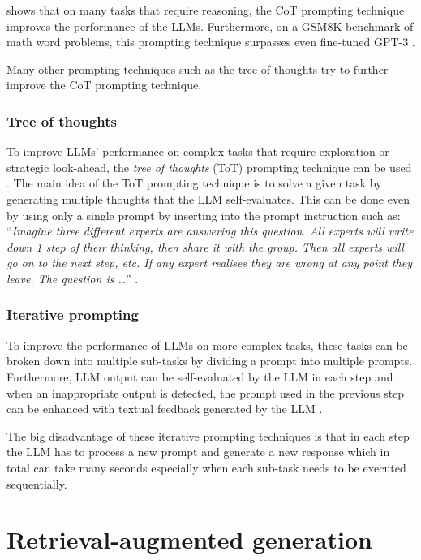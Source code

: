 \citet{Wei2022} shows that on many tasks that require reasoning, the CoT prompting technique improves the performance of the LLMs. Furthermore, on a GSM8K benchmark of math word problems, this prompting technique surpasses even fine-tuned GPT-3 \cite{Wei2022}.

Many other prompting techniques such as the tree of thoughts try to further improve the CoT prompting technique.


\subsubsection{Tree of thoughts}
\label{sec:tree_of_thoughts}

To improve LLMs' performance on complex tasks that require exploration or strategic look-ahead, the \emph{tree of thoughts} (ToT) prompting technique can be used \cite{Long2023, Yao2024}. The main idea of the ToT prompting technique is to solve a given task by generating multiple thoughts that the LLM self-evaluates. This can be done even by using only a single prompt by inserting into the prompt instruction such as: ``\textit{Imagine three different experts are answering this question. All experts will write down 1 step of their thinking, then share it with the group. Then all experts will go on to the next step, etc. If any expert realises they are wrong at any point they leave. The question is \ldots}'' \cite{Hulbert2023}.


\subsubsection{Iterative prompting}
\label{sec:iterative_prompting}

To improve the performance of LLMs on more complex tasks, these tasks can be broken down into multiple sub-tasks by dividing a prompt into multiple prompts. Furthermore, LLM output can be self-evaluated by the LLM in each step and when an inappropriate output is detected, the prompt used in the previous step can be enhanced with textual feedback generated by the LLM \cite{Shinn2024}.

The big disadvantage of these iterative prompting techniques is that in each step the LLM has to process a new prompt and generate a new response which in total can take many seconds especially when each sub-task needs to be executed sequentially.


\section{Retrieval-augmented generation}

